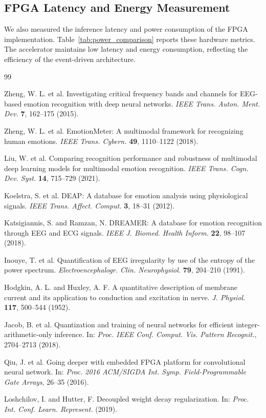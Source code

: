 \documentclass[12pt]{article}
\begin{document}
\subsection{FPGA Latency and Energy Measurement}

We also measured the inference latency and power consumption of the FPGA implementation. Table~\ref{tab:power_comparison} reports these hardware metrics. The accelerator maintains low latency and energy consumption, reflecting the efficiency of the event-driven architecture.



\begin{thebibliography}{99}

Zheng, W. L. et al.
Investigating critical frequency bands and channels for EEG-based emotion recognition with deep neural networks.
\textit{IEEE Trans. Auton. Ment. Dev.} \textbf{7}, 162--175 (2015).

Zheng, W. L. et al.
EmotionMeter: A multimodal framework for recognizing human emotions.
\textit{IEEE Trans. Cybern.} \textbf{49}, 1110--1122 (2018).

Liu, W. et al.
Comparing recognition performance and robustness of multimodal deep learning models for multimodal emotion recognition.
\textit{IEEE Trans. Cogn. Dev. Syst.} \textbf{14}, 715--729 (2021).

Koelstra, S. et al.
DEAP: A database for emotion analysis using physiological signals.
\textit{IEEE Trans. Affect. Comput.} \textbf{3}, 18--31 (2012).

Katsigiannis, S. and Ramzan, N.
DREAMER: A database for emotion recognition through EEG and ECG signals.
\textit{IEEE J. Biomed. Health Inform.} \textbf{22}, 98--107 (2018).

Inouye, T. et al.
Quantification of EEG irregularity by use of the entropy of the power spectrum.
\textit{Electroencephalogr. Clin. Neurophysiol.} \textbf{79}, 204--210 (1991).

Hodgkin, A. L. and Huxley, A. F.
A quantitative description of membrane current and its application to conduction and excitation in nerve.
\textit{J. Physiol.} \textbf{117}, 500--544 (1952).

Jacob, B. et al.
Quantization and training of neural networks for efficient integer-arithmetic-only inference.
In: \textit{Proc. IEEE Conf. Comput. Vis. Pattern Recognit.}, 2704--2713 (2018).

Qiu, J. et al.
Going deeper with embedded FPGA platform for convolutional neural network.
In: \textit{Proc. 2016 ACM/SIGDA Int. Symp. Field-Programmable Gate Arrays}, 26--35 (2016).

Loshchilov, I. and Hutter, F.
Decoupled weight decay regularization.
In: \textit{Proc. Int. Conf. Learn. Represent.} (2019).

\end{thebibliography}
\end{document}
